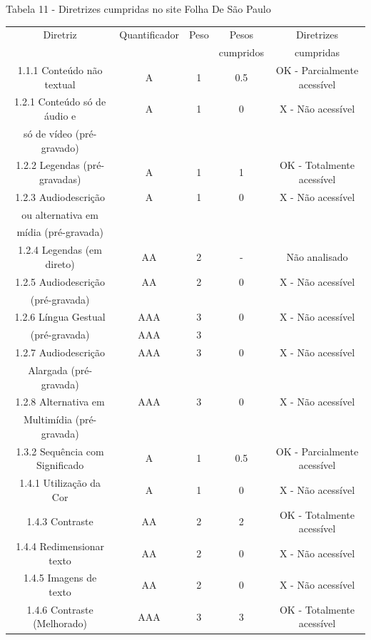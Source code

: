 \documentclass[a4paper]{article}
\begin{document}
\begin{titlepage}
Tabela 11 - Diretrizes cumpridas no site Folha De São Paulo\\[-1cm]
\begin{center}
	\fontsize{8pt}{8pt}\selectfont
	\begin{longtable}{|c|c|c|c|c|}
		\hline
		Diretriz & Quantificador & Peso & Pesos & Diretrizes\\
		& & & cumpridos & cumpridas\\
		\hline
		1.1.1 Conteúdo não textual & A & 1 & 0.5 & OK - Parcialmente acessível \\
		\hline
		1.2.1 Conteúdo só de áudio e & A & 1 & 0 & X - Não acessível \\
		só de vídeo (pré-gravado) & & & & \\
		\hline
		1.2.2 Legendas (pré-gravadas) & A & 1 & 1 & OK - Totalmente acessível \\
		\hline
		1.2.3 Audiodescrição & A & 1 & 0 & X - Não acessível \\
		ou alternativa em & & & & \\
		mídia (pré-gravada) & & & & \\
		\hline
		1.2.4 Legendas (em direto) & AA & 2 & - & Não analisado \\
		\hline
		1.2.5 Audiodescrição & AA & 2 & 0 & X - Não acessível \\
		(pré-gravada) & & & & \\
		\hline
		1.2.6 Língua Gestual & AAA & 3 & 0 & X - Não acessível \\
		(pré-gravada) & AAA & 3 & & \\
		\hline
		1.2.7 Audiodescrição & AAA & 3 & 0 & X - Não acessível \\
		Alargada (pré-gravada) & & & & \\
		\hline
		1.2.8 Alternativa em & AAA & 3 & 0 & X - Não acessível \\
		Multimídia (pré-gravada) & & & & \\
		\hline
		1.3.2 Sequência com Significado & A & 1 & 0.5 & OK - Parcialmente acessível \\
		\hline
		1.4.1 Utilização da Cor & A & 1 & 0 & X - Não acessível \\
		\hline
		1.4.3 Contraste & AA & 2 & 2 & OK - Totalmente acessível \\
		\hline
		1.4.4 Redimensionar texto & AA & 2 & 0 & X - Não acessível \\
		\hline
		1.4.5 Imagens de texto & AA & 2 & 0 & X - Não acessível \\
		\hline
		1.4.6 Contraste (Melhorado) & AAA & 3 & 3 & OK - Totalmente acessível \\

\end{longtable}
\end{center}
\end{titlepage}
\end{document}
